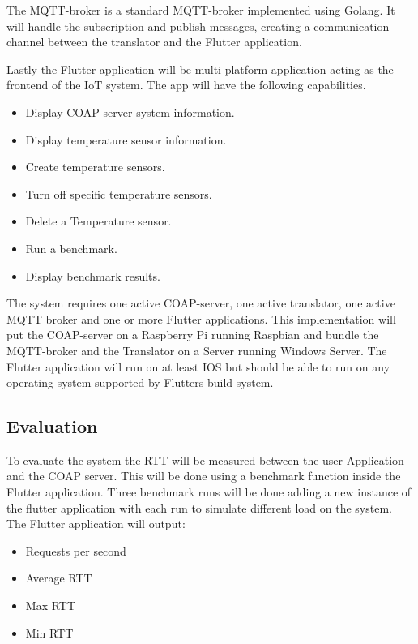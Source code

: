 The MQTT-broker is a standard MQTT-broker implemented using Golang. It will handle the subscription and publish messages, creating a communication channel between the translator and the Flutter application.

Lastly the Flutter application will be multi-platform application acting as the frontend of the IoT system. The app will have the following capabilities. 
\begin{itemize}
    \item Display COAP-server system information.
    \item Display temperature sensor information.
    \item Create temperature sensors.
    \item Turn off specific temperature sensors.
    \item Delete a Temperature sensor.
    \item Run a benchmark.
    \item Display benchmark results.
\end{itemize}

The system requires one active COAP-server, one active translator, one active MQTT broker and one or more Flutter applications. This implementation will put the COAP-server on a Raspberry Pi running Raspbian and bundle the MQTT-broker and the Translator on a Server running Windows Server. The Flutter application will run on at least IOS but should be able to run on any operating system supported by Flutters build system.

\subsection{Evaluation}
To evaluate the system the RTT will be measured between the user Application and the COAP server. This will be done using a benchmark function inside the Flutter application. Three benchmark runs will be done adding a new instance of the flutter application with each run to simulate different load on the system. The Flutter application will output:
\begin{itemize}
    \item Requests per second
    \item Average RTT
    \item Max RTT
    \item Min RTT
\end{itemize}



